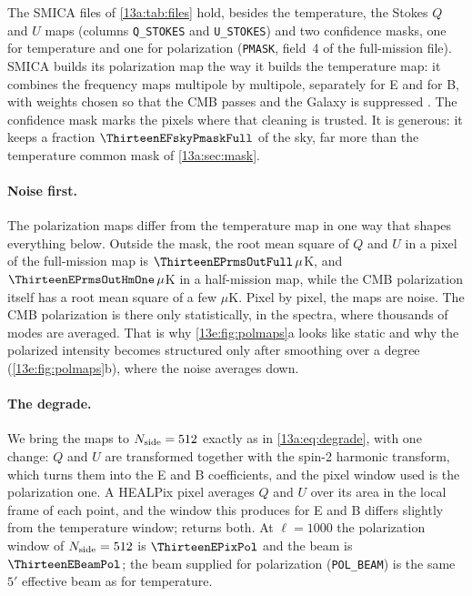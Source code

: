The SMICA files of \cref{13a:tab:files} hold, besides the temperature, the Stokes $Q$ and $U$ maps
(columns \texttt{Q\_STOKES} and \texttt{U\_STOKES}) and two confidence masks, one for temperature and one
for polarization (\texttt{PMASK}, field~4 of the full-mission file). SMICA builds its polarization map the
way it builds the temperature map: it combines the frequency maps multipole by multipole, separately for
E and for B, with weights chosen so that the CMB passes and the Galaxy is suppressed
\cite[§3]{Planck2018IV}. The confidence mask marks the pixels where that cleaning is trusted. It is
generous: it keeps a fraction $\ThirteenEFskyPmaskFull$ of the sky, far more than the temperature
common mask of \cref{13a:sec:mask}.

\paragraph{Noise first.} The polarization maps differ from the temperature map in one way that shapes
everything below. Outside the mask, the root mean square of $Q$ and $U$ in a pixel of the full-mission
map is $\ThirteenEPrmsOutFull\,\mu$K, and $\ThirteenEPrmsOutHmOne\,\mu$K in a half-mission map, while the CMB
polarization itself has a root mean square of a few $\mu$K. Pixel by pixel, the maps are noise. The CMB
polarization is there only statistically, in the spectra, where thousands of modes are averaged. That is why
\cref{13e:fig:polmaps}a looks like static and why the polarized intensity becomes structured only after
smoothing over a degree (\cref{13e:fig:polmaps}b), where the noise averages down.

\paragraph{The degrade.} We bring the maps to $N_{\rm side}=512$ exactly as in \eqref{13a:eq:degrade}, with
one change: $Q$ and $U$ are transformed together with the spin-2 harmonic transform, which turns them into
the E and B coefficients, and the pixel window used is the polarization one. A HEALPix pixel averages $Q$ and
$U$ over its area in the local frame of each point, and the window this produces for E and B differs slightly
from the temperature window;  returns both. At $\ell=1000$ the polarization
window of $N_{\rm side}=512$ is $\ThirteenEPixPol$ and the beam is $\ThirteenEBeamPol$; the beam supplied for
polarization (\texttt{POL\_BEAM}) is the same $5'$ effective beam as for temperature.

